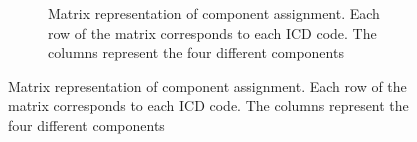 \documentclass[
  sn-mathphys-num,
]{sn-jnl}
\begin{document}
\begin{figure}

\begin{minipage}{0.29\linewidth}

\begin{figure}[H]


\caption{\label{fig-4-matrix}Matrix representation of component
assignment. Each row of the matrix corresponds to each ICD code. The
columns represent the four different components}


\end{figure}
\end{minipage}
\end{figure}
\end{document}
